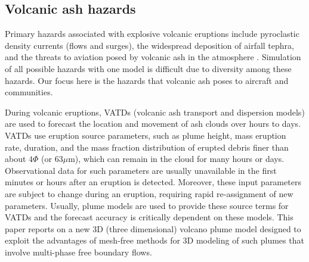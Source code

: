 \documentclass[journal abbreviation, manuscript]{copernicus}
\begin{document}
\introduction  %
\subsection{Volcanic ash hazards}

 Primary hazards associated with explosive volcanic eruptions include pyroclastic density currents (flows and surges), the widespread deposition of airfall tephra, and the threats to aviation posed by volcanic ash in the atmosphere
\citep{lockwood2013volcanoes}.
Simulation of all possible hazards with one model is difficult due to diversity among these hazards. Our focus here is  the hazards that volcanic ash poses to aircraft and communities. 

During volcanic eruptions, VATDs (volcanic ash transport and dispersion models) are used to forecast the location and movement of ash clouds over hours to days.  VATDs use eruption source parameters, such as plume height, mass eruption rate, duration, and the mass fraction distribution of erupted debris finer than about $4 \Phi$ (or $63  \mu$m), which can remain in the cloud for many hours or days. Observational data for such parameters are usually unavailable in the first minutes or hours after an eruption is detected. Moreover, these input parameters are subject to change during an eruption, requiring rapid re-assignment of new parameters. Usually, plume models are used to provide these source terms for VATDs and the forecast accuracy is critically dependent on these models. This paper reports on a new 3D (three dimensional) volcano plume model designed to exploit the advantages of mesh-free methods for 3D modeling of such plumes  that involve multi-phase free boundary flows.
\end{document}
